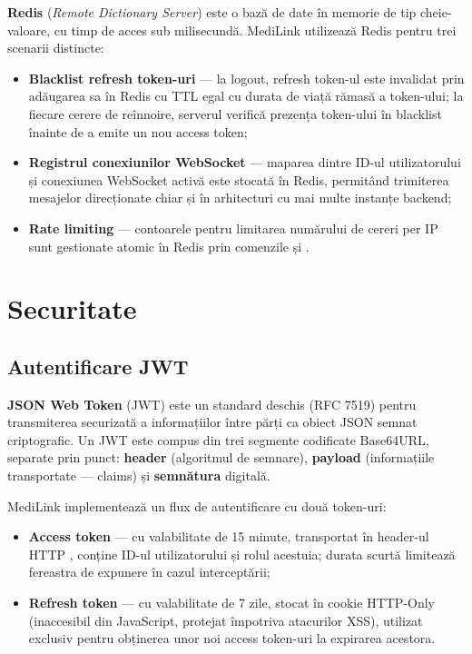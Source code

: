\textbf{Redis} \cite{redis2024} (\textit{Remote Dictionary Server}) este o bază de date în memorie de tip cheie-valoare, cu timp de acces sub milisecundă. MediLink utilizează Redis pentru trei scenarii distincte:

\begin{itemize}
  \item \textbf{Blacklist refresh token-uri} --- la logout, refresh token-ul este invalidat prin adăugarea sa în Redis cu TTL egal cu durata de viață rămasă a token-ului; la fiecare cerere de reînnoire, serverul verifică prezența token-ului în blacklist înainte de a emite un nou access token;
  \item \textbf{Registrul conexiunilor WebSocket} --- maparea dintre ID-ul utilizatorului și conexiunea WebSocket activă este stocată în Redis, permitând trimiterea mesajelor direcționate chiar și în arhitecturi cu mai multe instanțe backend;
  \item \textbf{Rate limiting} --- contoarele pentru limitarea numărului de cereri per IP sunt gestionate atomic în Redis prin comenzile  și .
\end{itemize}

\section{Securitate}

\subsection{Autentificare JWT}

\textbf{JSON Web Token} (JWT) \cite{rfc7519} este un standard deschis (RFC 7519) pentru transmiterea securizată a informațiilor între părți ca obiect JSON semnat criptografic. Un JWT este compus din trei segmente codificate Base64URL, separate prin punct: \textbf{header} (algoritmul de semnare), \textbf{payload} (informațiile transportate --- claims) și \textbf{semnătura} digitală.

MediLink implementează un flux de autentificare cu două token-uri:

\begin{itemize}
  \item \textbf{Access token} --- cu valabilitate de 15 minute, transportat în header-ul HTTP , conține ID-ul utilizatorului și rolul acestuia; durata scurtă limitează fereastra de expunere în cazul interceptării;
  \item \textbf{Refresh token} --- cu valabilitate de 7 zile, stocat în cookie HTTP-Only (inaccesibil din JavaScript, protejat împotriva atacurilor XSS), utilizat exclusiv pentru obținerea unor noi access token-uri la expirarea acestora.
\end{itemize}

